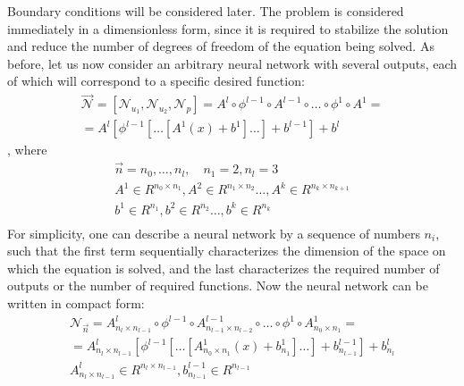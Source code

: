 Boundary conditions will be considered later. The problem is considered immediately in a dimensionless form, since it is required to stabilize the solution and reduce the number of degrees of freedom of the equation being solved. As before, let us now consider an arbitrary neural network with several outputs, each of which will correspond to a specific desired function:
\begin{equation}
	\label{eq:model_stokes_arb}
	\begin{multlined}
		\vec{\mathcal{N}} = [\mathcal{N}_{u_1}, \mathcal{N}_{u_2}, \mathcal{N}_p] = A^l \circ \phi^{l - 1} \circ A^{l - 1} \circ \dots \circ \phi^1 \circ A^1 = \\ = A^l \left [ \phi^{l - 1} \left [ \dots \left [ A^1 (x) + b^1 \right ] \dots \right ] + b^{l - 1} \right] + b^l
	\end{multlined}
\end{equation}
, where
\begin{equation}
	\begin{multlined}
		\vec{n} = {n_0, \dots, n_l}, \quad n_1 = 2, n_l = 3 \\
		A^{1} \in R^{n_0 \times n_1}, A^{2} \in R^{n_1 \times n_2} \dots, A^{k} \in R^{n_k \times n_{k + 1}} \\
		b^{1} \in R^{n_1}, b^{2} \in R^{n_2} \dots, b^{k} \in R^{n_k} \\
	\end{multlined}
\end{equation}
For simplicity, one can describe a neural network by a sequence of numbers $n_i$, such that the first term sequentially characterizes the dimension of the space on which the equation is solved, and the last characterizes the required number of outputs or the number of required functions. Now the neural network can be written in compact form:
\begin{equation}
	\label{eq:neural_net_by_vec}
	\begin{multlined}
		\mathcal{N}_{\vec{n}} = A^l_{n_{l} \times n_{l - 1}} \circ \phi^{l - 1} \circ A^{l - 1}_{n_{l - 1} \times n_{l - 2}} \circ \dots \circ \phi^1 \circ A^1_{n_{0} \times n_{1}} = \\ = A^l_{n_{l} \times n_{l - 1}} \left [ \phi^{l - 1} \left [ \dots \left [ A^1_{n_{0} \times n_{1}} (x) + b^1_{n_1} \right ] \dots \right ] + b^{l - 1}_{n_{l - 1}} \right] + b^l_{n_l} \\ A^l_{n_{l} \times n_{l - 1}} \in R^{n_{l} \times n_{l - 1}}, b^{l - 1}_{n_{l - 1}} \in R^{n_{l - 1}}
	\end{multlined}
\end{equation}

